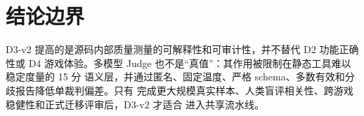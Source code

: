 \documentclass[UTF8,zihao=-4,fontset=fandol]{ctexart}
\begin{document}
\section{结论边界}

D3-v2 提高的是源码内部质量测量的可解释性和可审计性，并不替代 D2 功能正确性或 D4
游戏体验。多模型 Judge 也不是“真值”：其作用被限制在静态工具难以稳定度量的 15 分
语义层，并通过匿名、固定温度、严格 schema、多数有效和分歧报告降低单裁判偏差。只有
完成更大规模真实样本、人类盲评相关性、跨游戏稳健性和正式迁移评审后，D3-v2 才适合
进入共享流水线。
\end{document}
